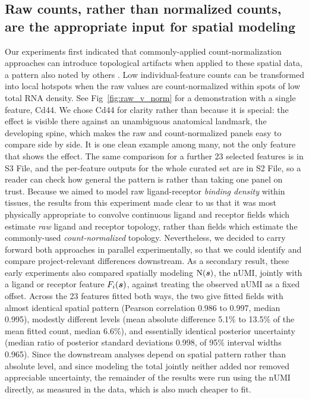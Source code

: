 \documentclass[10pt,letterpaper]{article}
\begin{document}
\subsection*{Raw counts, rather than normalized counts, are the appropriate input for spatial modeling}

Our experiments first indicated that commonly-applied count-normalization approaches can introduce topological artifacts when applied to these spatial data, a pattern also noted by others \cite{Bhuva2024}. Low individual-feature counts  can be transformed into local hotspots when the raw values are count-normalized within spots of low total RNA density. See Fig~\ref{fig:raw_v_norm} for a demonstration with a single feature, Cd44. We chose Cd44 for clarity rather than because it is special: the effect is visible there against an unambiguous anatomical landmark, the developing spine, which makes the raw and count-normalized panels easy to compare side by side. It is one clean example among many, not the only feature that shows the effect. The same comparison for a further 23 selected features is in S3 File, and the per-feature outputs for the whole curated set are in S2 File, so a reader can check how general the pattern is rather than taking one panel on trust. Because we aimed to model raw ligand-receptor \textit{binding density} within tissues, the results from this experiment made clear to us that it was most physically appropriate to convolve continuous ligand and receptor fields which estimate \textit{raw} ligand and receptor topology, rather than fields which estimate the commonly-used \textit{count-normalized} topology. Nevertheless, we decided to carry forward both approaches in parallel experimentally, so that we could identify and compare project-relevant differences downstream. As a secondary result, these early experiments also compared spatially modeling $\mbox{N}(\mbox{\boldmath $s$})$, the nUMI, jointly with a ligand or receptor feature $F_i(\mbox{\boldmath $s$})$, against treating the observed nUMI as a fixed offset. Across the 23 features fitted both ways, the two give fitted fields with almost identical spatial pattern (Pearson correlation 0.986 to 0.997, median 0.995), modestly different levels (mean absolute difference 5.1\% to 13.5\% of the mean fitted count, median 6.6\%), and essentially identical posterior uncertainty (median ratio of posterior standard deviations 0.998, of 95\% interval widths 0.965). Since the downstream analyses depend on spatial pattern rather than absolute level, and since modeling the total jointly neither added nor removed appreciable uncertainty, the remainder of the results were run using the nUMI directly, as measured in the data, which is also much cheaper to fit.
\end{document}
